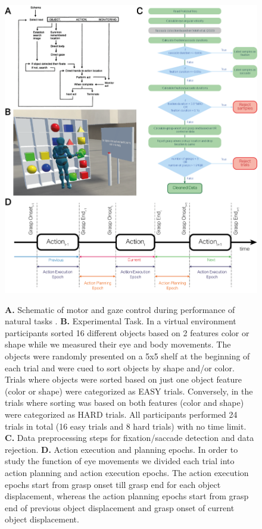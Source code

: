 \begin{figure}[H]
    \centering
    \includegraphics[width=1\linewidth]{source/figures/experiment_setup/Methods_1.png} \\
    \caption[]{\textbf{A.} Schematic of motor and gaze control during performance of natural tasks \citet{Land2001-do}. \textbf{B.} Experimental Task. In a virtual environment participants sorted 16 different objects based on 2 features color or shape while we measured their eye and body movements. The objects were randomly presented on a 5x5 shelf at the beginning of each trial and were cued to sort objects by shape and/or color. Trials where objects were sorted based on just one object feature (color or shape) were categorized as EASY trials. Conversely, in the trials where sorting was based on both features (color and shape) were categorized as HARD trials. All participants performed 24 trials in total (16 easy trials and 8 hard trials) with no time limit. \textbf{C.} Data preprocessing steps for fixation/saccade detection and data rejection. \textbf{D.} Action execution and planning epochs. In order to study the function of eye movements we divided each trial into action planning and action execution epochs. The action execution epochs start from grasp onset till grasp end for each object displacement, whereas the action planning epochs start from grasp end of previous object displacement and grasp onset of current object displacement.}
    \label{figure:task}
\end{figure}



